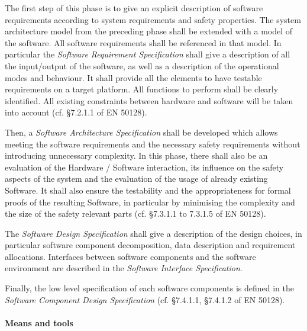 The first step of this phase is to give an explicit description of software requirements according to system requirements and safety properties. The system architecture model from the preceding phase shall be
extended with a model of the software. All software requirements shall be referenced in that model.
In particular the \emph{Software Requirement Specification} shall give a description of all the input/output of the software, as well as a description of the operational modes and behaviour. It shall provide all the elements to have testable requirements on a target platform. All functions to perform shall be clearly identified. All existing constraints between hardware and software will be taken into account (cf. §7.2.1.1 of EN 50128).



Then, a \emph{Software Architecture Specification} shall be developed which allows meeting the software
requirements and the necessary safety requirements without introducing
unnecessary complexity. In this phase, there shall also be an evaluation of the
Hardware / Software interaction, its influence on the safety aspects of the system and the
evaluation of the usage of already existing Software. It shall also ensure the
testability and the appropriateness for formal proofs of the resulting Software, in
particular by minimising the complexity and the size of the safety relevant
parts (cf. §7.3.1.1 to 7.3.1.5 of EN 50128).

The \emph{Software Design Specification} shall give a  description of the design choices, in particular software component decomposition, data description and requirement allocations. Interfaces between software components and the software environment are described in the \emph{Software Interface Specification}.

Finally, the low level specification of each software components is defined in the \emph{Software
Component Design Specification} (cf. §7.4.1.1, §7.4.1.2 of EN 50128).

\paragraph{Means and tools}
\label{sec:sw-means}

\begin{comment}
To be completed according requirement of EN50128  and D2.6
Use of formal methods to describe.
To each level shall be develop the semi-formal model ?

\end{comment}

